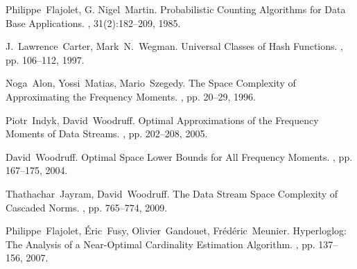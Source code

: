 \documentclass[11pt]{article}
\begin{document}
\begin{thebibliography}{42}

Philippe~Flajolet, G. Nigel~Martin.
\newblock Probabilistic Counting Algorithms for Data Base Applications.
, 31(2):182--209, 1985.

J.~Lawrence~Carter, Mark~N.~Wegman.
\newblock Universal Classes of Hash Functions.
, pp. 106--112, 1997.

Noga~Alon, Yossi~Matias, Mario~Szegedy.
\newblock The Space Complexity of Approximating the Frequency Moments.
, pp. 20--29, 1996.

Piotr~Indyk, David~Woodruff.
\newblock Optimal Approximations of the Frequency Moments of Data Streams.
, pp. 202--208, 2005.

David~Woodruff.
\newblock Optimal Space Lower Bounds for All Frequency Moments.
, pp. 167--175, 2004.

Thathachar~Jayram, David~Woodruff.
\newblock The Data Stream Space Complexity of Cascaded Norms.
, pp. 765--774, 2009.

Philippe~Flajolet, {\'E}ric~Fusy, Olivier~Gandouet, Fr{\'e}d{\'e}ric~Meunier.
\newblock Hyperloglog: The Analysis of a Near-Optimal Cardinality Estimation Algorithm.
, pp. 137--156, 2007.

\end{thebibliography}
\end{document}

